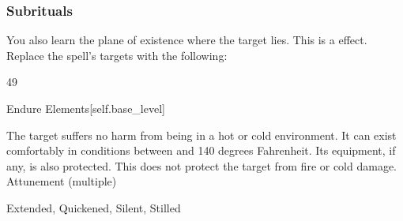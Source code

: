 \subsubsection{Subrituals}
You also learn the plane of existence where the target lies.
This is a  effect.
Replace the spell's targets with the following:
\begin{spellcontent}
\begin{augmenttargetinginfo}
 49
\end{augmenttargetinginfo}
\end{spellcontent}
\begin{spellsection}{Endure Elements}[self.base_level]
\begin{spellcontent}
\begin{spelltargetinginfo}
\end{spelltargetinginfo}
\begin{spelleffects}
\spelleffect
The target suffers no harm from being in a hot or cold environment.
It can exist comfortably in conditions between  and 140 degrees Fahrenheit.
Its equipment, if any, is also protected.
This does not protect the target from fire or cold damage.
\spelldur Attunement (multiple)
\end{spelleffects}
\end{spellcontent}
\begin{spellfooter}
 Extended, Quickened, Silent, Stilled
\end{spellfooter}
\begin{spellsubcontent}
\end{spellsubcontent}
\end{spellsection}
